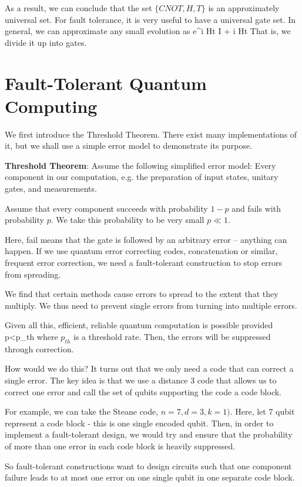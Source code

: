 As a result, we can conclude that the set $\{CNOT, H, T\}$ is an approximately universal set. For fault tolerance, it is very useful to have a universal gate set. In general, we can approximate any small evolution as 
\beq
e^{i Ht} \simeq I + i Ht
\eeq
That is, we divide it up into gates. 

\section{Fault-Tolerant Quantum Computing}
We first introduce the Threshold Theorem. There exist many implementations of it, but we shall use a simple error model to demonstrate its purpose. 

\textbf{Threshold Theorem}: Assume the following simplified error model: Every component in our computation, e.g. the preparation of input states, unitary gates, and measurements. 

Assume that every component succeeds with probability $1-p$ and fails with probability $p$. We take this probability to be very small $p\ll 1$. 

Here, fail means that the gate is followed by an arbitrary error -- anything can happen. If we use quantum error correcting codes, concatenation or similar, frequent error correction, we need a fault-tolerant construction to stop errors from spreading. 

We find that certain methods cause errors to spread to the extent that they multiply. We thus need to prevent single errors from turning into multiple errors. 

Given all this, efficient, reliable quantum computation is possible provided
\beq
p<p_{th}
\eeq
where $p_{th}$ is a threshold rate. Then, the errors will be suppressed through correction. 

How would we do this? It turns out that we only need a code that can correct a single error.  The key idea is that we use a distance 3 code that allows us to correct one error and call the set of qubits supporting the code a code block. 

For example, we can take the Steane code, $n = 7, d = 3, k = 1)$. Here, let 7 qubit represent a code block - this is one single encoded qubit. Then, in order to implement a fault-tolerant design, we would try and ensure that the probability of more than one error in each code block is heavily suppressed. 

So fault-tolerant constructions want to design circuits such that one component failure leads to at most one error on one single qubit in one separate code block. 

